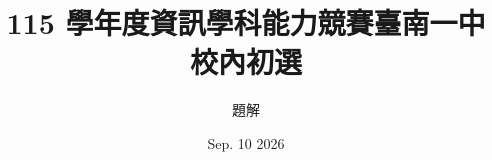 

\title{115 學年度資訊學科能力競賽臺南一中\\ 校內初選}
\author{題解}
\date{Sep. 10 2026}



\begin{frame}
\vspace{-1.6em}
\titlepage
\end{frame}











